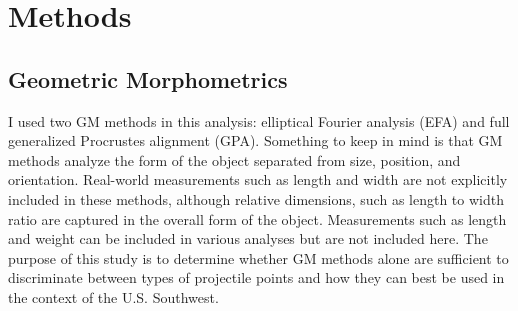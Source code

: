 \documentclass[a4paper]{article}
\begin{document}
\hypertarget{methods}{%
\section*{Methods}\label{methods}}

\hypertarget{geometric-morphometrics}{%
\subsection*{Geometric Morphometrics}\label{geometric-morphometrics}}

I used two GM methods in this analysis: elliptical Fourier analysis (EFA) and full generalized Procrustes alignment (GPA). Something to keep in mind is that GM methods analyze the form of the object separated from size, position, and orientation. Real-world measurements such as length and width are not explicitly included in these methods, although relative dimensions, such as length to width ratio are captured in the overall form of the object. Measurements such as length and weight can be included in various analyses but are not included here. The purpose of this study is to determine whether GM methods alone are sufficient to discriminate between types of projectile points and how they can best be used in the context of the U.S. Southwest.
\end{document}
